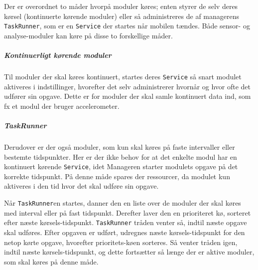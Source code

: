 Der er overordnet to måder hvorpå moduler køres; enten styrer de selv deres kørsel (kontinuerte kørende moduler) eller så administreres de af managerens \texttt{TaskRunner}, som er en \texttt{Service} der startes når mobilen tændes.
Både sensor- og analyse-moduler kan køre på disse to forskellige måder.

\subparagraph{Kontinuerligt kørende moduler}
Til moduler der skal køres kontinuert, startes deres \texttt{Service} så snart modulet aktiveres i indstillinger, hvorefter det selv administrerer hvornår og hvor ofte det udfører sin opgave.
Dette er for moduler der skal samle kontinuert data ind, som fx et modul der bruger accelerometer.

\subparagraph{TaskRunner}
Derudover er der også moduler, som kun skal køres på faste intervaller eller bestemte tidspunkter.
Her er der ikke behov for at det enkelte modul har en kontinuert kørende \texttt{Service}, idet Manageren starter modulets opgave på det korrekte tidspunkt.
På denne måde spares der ressourcer, da modulet kun aktiveres i den tid hvor det skal udføre sin opgave. 

Når \texttt{TaskRunner}en startes, danner den en liste over de moduler der skal køres med interval eller på fast tidspunkt.
Derefter laver den en prioriteret kø, sorteret efter næste kørsels-tidspunkt.
\texttt{TaskRunner} tråden venter så, indtil næste opgave skal udføres.
Efter opgaven er udført, udregnes næste kørsels-tidspunkt for den netop kørte opgave, hvorefter prioritets-køen sorteres.
Så venter tråden igen, indtil næste kørsels-tidspunkt, og dette fortsætter så længe der er aktive moduler, som skal køres på denne måde.
